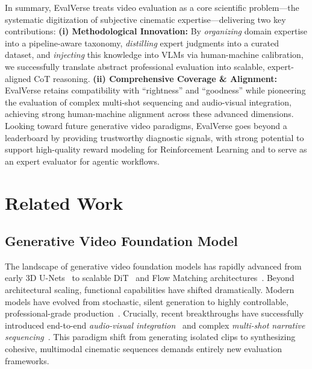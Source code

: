 \documentclass{llmxive}
\begin{document}
In summary, EvalVerse treats video evaluation as a core scientific problem—the systematic digitization of subjective cinematic expertise—delivering two key contributions: \textbf{(i) Methodological Innovation:} By \textit{organizing} domain expertise into a pipeline-aware taxonomy, \textit{distilling} expert judgments into a curated dataset, and \textit{injecting} this knowledge into VLMs via human-machine calibration, we successfully translate abstract professional evaluation into scalable, expert-aligned CoT reasoning. \textbf{(ii) Comprehensive Coverage \& Alignment:} EvalVerse retains compatibility with ``rightness'' and ``goodness'' while pioneering the evaluation of complex multi-shot sequencing and audio-visual integration, achieving strong human-machine alignment across these advanced dimensions. Looking toward future generative video paradigms, EvalVerse goes beyond a leaderboard by providing trustworthy diagnostic signals, with strong potential to support high-quality reward modeling for Reinforcement Learning and to serve as an expert evaluator for agentic workflows.

\section{Related Work}

\subsection{Generative Video Foundation Model}

The landscape of generative video foundation models has rapidly advanced from early 3D U-Nets~\cite{svd} to scalable DiT~\cite{dit} and Flow Matching architectures~\cite{wan, hunyuanvideo}. Beyond architectural scaling, functional capabilities have shifted dramatically. Modern models have evolved from stochastic, silent generation to highly controllable, professional-grade production~\cite{cogvideox, luma}. Crucially, recent breakthroughs have successfully introduced end-to-end \textit{audio-visual integration}~\cite{sora2, ltx, kling, seedance2} and complex \textit{multi-shot narrative sequencing}~\cite{guo2025longcontexttuning, holocine, multishotmaster}. This paradigm shift from generating isolated clips to synthesizing cohesive, multimodal cinematic sequences demands entirely new evaluation frameworks.


\end{document}
